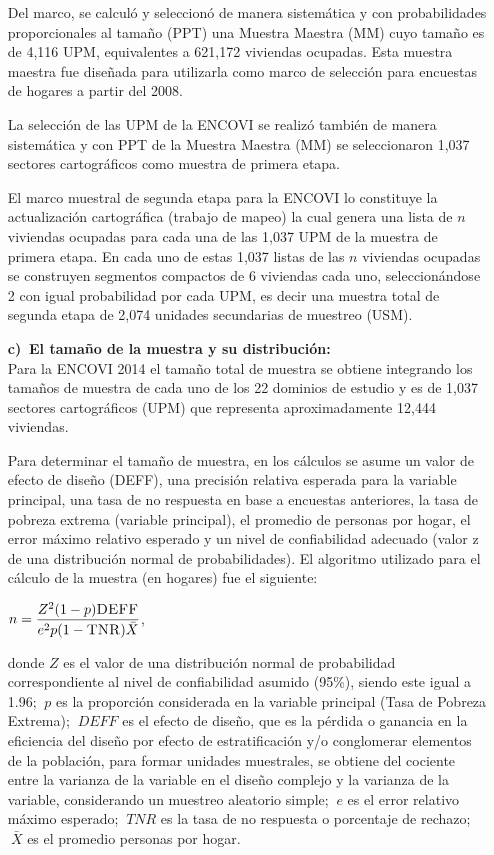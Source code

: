\begin{itemize}
	Del marco, se calculó y seleccionó  de manera sistemática y  con probabilidades proporcionales al tamaño (PPT) una Muestra Maestra (MM) cuyo tamaño es de 4,116 UPM, equivalentes a 621,172 viviendas ocupadas. Esta muestra maestra fue diseñada para utilizarla como marco de selección para encuestas de hogares a  partir del 2008.
	
	La selección de las UPM de la ENCOVI se realizó también de manera sistemática y con PPT de la Muestra Maestra (MM) se seleccionaron 1,037 sectores cartográficos como muestra de primera etapa.
	
	El marco muestral de segunda etapa para la ENCOVI lo constituye la actualización cartográfica (trabajo de mapeo) la cual genera una lista de $n$ viviendas ocupadas para cada una de las 1,037 UPM de la muestra de primera etapa. En cada uno de estas 1,037 listas de las $n$ viviendas ocupadas se construyen segmentos compactos de 6 viviendas cada uno, seleccionándose 2 con igual probabilidad por cada UPM, es decir una muestra total de segunda etapa de 2,074 unidades secundarias de muestreo (USM). 
	
	\item[\large\textbf{c)}$\ $]	\textbf{\large El tamaño de la muestra y su distribución:} \\[3mm]
	Para la ENCOVI 2014 el tamaño total de muestra se obtiene integrando los tamaños de muestra de cada uno de los 22 dominios de estudio y es de 1,037 sectores cartográficos (UPM) que representa aproximadamente 12,444 viviendas. 
	
	Para determinar el tamaño de muestra, en los cálculos se asume un valor de efecto de diseño (DEFF), una precisión relativa esperada para la variable principal, una tasa de no respuesta en base a encuestas anteriores, la tasa de pobreza extrema (variable principal), el promedio de personas por hogar, el error máximo relativo esperado y un nivel de confiabilidad adecuado (valor z de una distribución normal de probabilidades). El algoritmo utilizado para el cálculo de la muestra (en hogares) fue el siguiente:
	
	\begin{center}
		$n=\dfrac{Z^2(1-p)\text{\textsc{DEFF}}}{e^2p(1-\text{\textsc{TNR}})\bar{X}}$,
	\end{center}
	
	
	donde $Z $ es el valor de una distribución normal de probabilidad correspondiente  al nivel de confiabilidad asumido (95\%), siendo este igual a 1.96; $\ p $ es la proporción considerada en la variable principal (Tasa de Pobreza Extrema); $\ DEFF $ es el efecto de diseño,  que es la pérdida o ganancia en la eficiencia del diseño por efecto de estratificación y/o  conglomerar elementos de la población, para formar unidades muestrales, se obtiene del cociente entre la varianza de la variable en el  diseño complejo y la varianza de la variable, considerando un muestreo aleatorio simple; $\ e $ es el error relativo máximo esperado; $\ TNR $ es la tasa de no respuesta o porcentaje de rechazo; $\ \bar{X}$ es el promedio personas por hogar.
	

\end{itemize}
